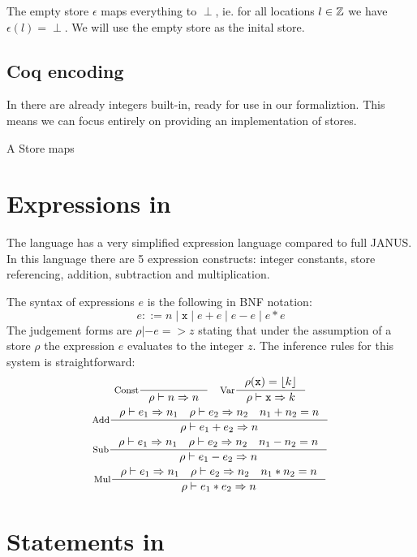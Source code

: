 The empty store $\epsilon$ maps everything to $\perp$, ie. for all
locations $l \in \mathbb{Z}$ we have $\epsilon(l) = \perp$. We will use the
empty store as the inital store.

\subsection{Coq encoding}

In \coq{} there are already integers built-in, ready for use in our
formaliztion. This means we can focus entirely on providing an
implementation of stores.

A Store maps 

\section{Expressions in \janusz{}}

The \janusz{} language has a very simplified expression language
compared to full JANUS. In this language there are 5 expression
constructs: integer constants, store referencing, addition,
subtraction and multiplication.

The syntax of expressions $e$ is the following in BNF notation:
\newcommand{\bor}{\; | \;}
\begin{equation*}
  e ::= n \bor \mathtt{x} \bor e + e \bor e - e \bor e * e
\end{equation*}
The judgement forms are $\rho |- e => z$ stating that under the
assumption of a store $\rho$ the expression $e$ evaluates to the
integer $z$. The inference rules for this system is straightforward:
\begin{gather*}
  \inference[Const]{}{\rho |- n => n} \quad \inference[Var]{\rho(\mathtt{x}) =
    \lift{k}}{\rho |- \mathtt{x} => k} \\
  \inference[Add]{\rho |- e_1 => n_1 \quad \rho |- e_2 => n_2 \quad
    n_1 + n_2 = n}{\rho |- e_1 + e_2 => n} \\
  \inference[Sub]{\rho |- e_1 => n_1 \quad \rho |- e_2 => n_2 \quad
    n_1 - n_2 = n}{\rho |- e_1 - e_2 => n} \\
  \inference[Mul]{\rho |- e_1 => n_1 \quad \rho |- e_2 => n_2 \quad
    n_1 * n_2 = n}{\rho |- e_1 * e_2 => n}
\end{gather*}

\section{Statements in \janusz{}}

